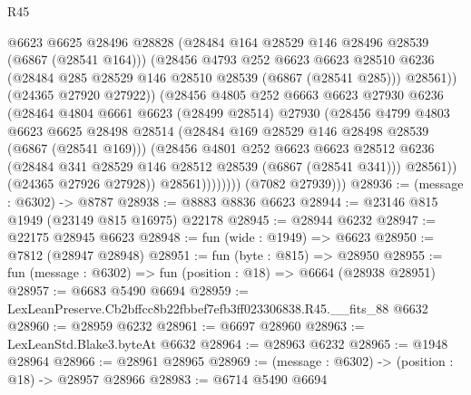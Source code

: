 \begin{lexlean}{R45}
\begin{coremodule}
{                          @6623
                          @6625
                          @28496
                          @28828
                          (@28484 @164 @28529 @146 @28496 @28539 (@6867 (@28541 @164)))
                          (@28456
                            @4793
                            @252
                            @6623
                            @6623
                            @28510
                            @6236
                            (@28484 @285 @28529 @146 @28510 @28539 (@6867 (@28541 @285)))
                            @28561))
                        (@24365 @27920 @27922))
                      (@28456
                        @4805
                        @252
                        @6663
                        @6623
                        @27930
                        @6236
                        (@28464
                          @4804
                          @6661
                          @6623
                          (@28499 @28514)
                          @27930
                          (@28456
                            @4799
                            @4803
                            @6623
                            @6625
                            @28498
                            @28514
                            (@28484 @169 @28529 @146 @28498 @28539 (@6867 (@28541 @169)))
                            (@28456
                              @4801
                              @252
                              @6623
                              @6623
                              @28512
                              @6236
                              (@28484 @341 @28529 @146 @28512 @28539 (@6867 (@28541 @341)))
                              @28561))
                          (@24365 @27926 @27928))
                        @28561))))))))
        (@7082 @27939)))
@28936 := (message : @6302) -> @8787
@28938 := @8883 @8836 @6623
@28944 := @23146 @815 @1949 (@23149 @815 @16975) @22178
@28945 := @28944 @6232
@28947 := @22175 @28945 @6623
@28948 := fun (wide : @1949) => @6623
@28950 := @7812 (@28947 @28948)
@28951 := fun (byte : @815) => @28950
@28955 := fun (message : @6302) => fun (position : @18) => @6664 (@28938 @28951)
@28957 := @6683 @5490 @6694
@28959 := LexLeanPreserve.Cb2bffcc8b22fbbef7efb3ff023306838.R45.__fits_88 @6632
@28960 := @28959 @6232
@28961 := @6697 @28960
@28963 := LexLeanStd.Blake3.byteAt @6632
@28964 := @28963 @6232
@28965 := @1948 @28964
@28966 := @28961 @28965
@28969 := (message : @6302) -> (position : @18) -> @28957 @28966
@28983 := @6714
    @5490
    @6694
}
\end{coremodule}
\end{lexlean}
